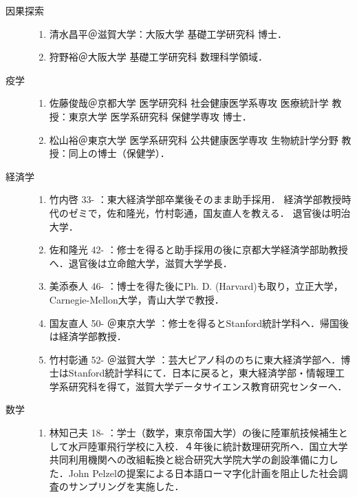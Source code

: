 \documentclass[uplatex,dvipdfmx]{jsreport}
\begin{document}
\begin{history}[日本の主な研究者]\mbox{}
    \begin{description}
        \item[因果探索] \mbox{}\begin{enumerate}
            \item 清水昌平＠滋賀大学：大阪大学 基礎工学研究科 博士．
            \item 狩野裕＠大阪大学 基礎工学研究科 数理科学領域．
        \end{enumerate}
        \item[疫学] \mbox{}\begin{enumerate}
            \item 佐藤俊哉＠京都大学 医学研究科 社会健康医学系専攻 医療統計学 教授：東京大学 医学系研究科 保健学専攻 博士．
            \item 松山裕＠東京大学 医学系研究科 公共健康医学専攻 生物統計学分野 教授：同上の博士（保健学）．
        \end{enumerate}
        \item[経済学] \mbox{}\begin{enumerate}
            \item 竹内啓 33- ：東大経済学部卒業後そのまま助手採用．
            経済学部教授時代のゼミで，佐和隆光，竹村彰通，国友直人を教える．
            退官後は明治大学．
            \item 佐和隆光 42- ：修士を得ると助手採用の後に京都大学経済学部助教授へ．退官後は立命館大学，滋賀大学学長．
            \item 美添泰人 46- ：博士を得た後にPh. D. (Harvard)も取り，立正大学，Carnegie-Mellon大学，青山大学で教授．
            \item 国友直人 50- ＠東京大学 ：修士を得るとStanford統計学科へ．帰国後は経済学部教授．
            \item 竹村彰通 52- ＠滋賀大学 ：芸大ピアノ科ののちに東大経済学部へ．博士はStanford統計学科にて．日本に戻ると，東大経済学部・情報理工学系研究科を得て，滋賀大学データサイエンス教育研究センターへ．
        \end{enumerate}
        \item[数学] \mbox{}\begin{enumerate}
            \item 林知己夫 18- ：学士（数学，東京帝国大学）の後に陸軍航技候補生として水戸陸軍飛行学校に入校．４年後に統計数理研究所へ．国立大学共同利用機関への改組転換と総合研究大学院大学の創設準備に力した．John Pelzelの提案による日本語ローマ字化計画を阻止した社会調査のサンプリングを実施した．

\end{enumerate}
\end{description}
\end{history}
\end{document}
